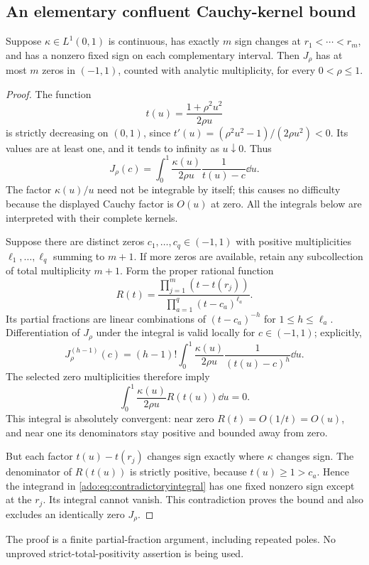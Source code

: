\subsection{An elementary confluent Cauchy-kernel bound}
\begin{lemma}
\label{ado:lem:variation}
Suppose $\kappa\in L^1(0,1)$ is continuous, has exactly $m$ sign
changes at $r_1<\cdots<r_m$, and has a nonzero fixed sign on each
complementary interval. Then $J_\rho$ has at most $m$ zeros in
$(-1,1)$, counted with analytic multiplicity, for every $0<\rho\le1$.
\end{lemma}
\begin{proof}
The function
\begin{equation}\label{ado:eq:cauchymap}
 t(u)=\frac{1+\rho^2u^2}{2\rho u}
\end{equation}
is strictly decreasing on $(0,1)$, since
$t'(u)=(\rho^2u^2-1)/(2\rho u^2)<0$. Its values are at least one,
and it tends to infinity as $u\downarrow0$. Thus
\[
 J_\rho(c)=\int_0^1\frac{\kappa(u)}{2\rho u}
                         \frac1{t(u)-c}\dd u.
\]
The factor $\kappa(u)/u$ need not be integrable by itself; this causes
no difficulty because the displayed Cauchy factor is $O(u)$ at zero.
All the integrals below are interpreted with their complete kernels.

Suppose there are distinct zeros $c_1,\ldots,c_q\in(-1,1)$ with
positive multiplicities $\ell_1,\ldots,\ell_q$ summing to $m+1$.
If more zeros are available, retain any subcollection of total
multiplicity $m+1$. Form the proper rational function
\begin{equation}\label{ado:eq:variationrational}
 R(t)=\frac{\prod_{j=1}^m(t-t(r_j))}
             {\prod_{a=1}^q(t-c_a)^{\ell_a}}.
\end{equation}
Its partial fractions are linear combinations of
$(t-c_a)^{-h}$ for $1\le h\le\ell_a$. Differentiation of $J_\rho$
under the integral is valid locally for $c\in(-1,1)$; explicitly,
\[
 J_\rho^{(h-1)}(c)
 =(h-1)!\int_0^1\frac{\kappa(u)}{2\rho u}
                         \frac1{(t(u)-c)^h}\dd u.
\]
The selected zero multiplicities therefore imply
\begin{equation}\label{ado:eq:contradictoryintegral}
 \int_0^1\frac{\kappa(u)}{2\rho u}R(t(u))\dd u=0.
\end{equation}
This integral is absolutely convergent: near zero $R(t)=O(1/t)=O(u)$,
and near one its denominators stay positive and bounded away from zero.

But each factor $t(u)-t(r_j)$ changes sign exactly where $\kappa$
changes sign. The denominator of $R(t(u))$ is strictly positive, because
$t(u)\ge1>c_a$. Hence the integrand in
\eqref{ado:eq:contradictoryintegral} has one fixed nonzero sign except
at the $r_j$. Its integral cannot vanish. This contradiction proves the
bound and also excludes an identically zero $J_\rho$.
\end{proof}
The proof is a finite partial-fraction argument, including repeated poles.
No unproved strict-total-positivity assertion is being used.

